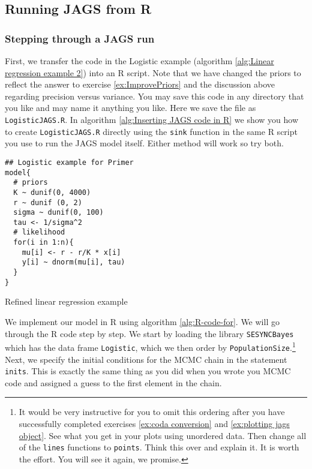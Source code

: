 \documentclass[12pt,english]{article}
\begin{document}
\subsection{Running JAGS from R}

\subsubsection{Stepping through a JAGS run} \label{sssec:Stepping through a JAGS run}

First, we transfer the code in the Logistic example (algorithm \ref{alg:Linear regression example 2}) into an R script. Note that we have changed the priors to reflect the answer to exercise \ref{ex:ImprovePriors} and the discussion above regarding precision versus variance. You may save this code in any directory that you like and may name it anything you like. Here we save the file as \texttt{LogisticJAGS.R}. In algorithm \ref{alg:Inserting JAGS code in R} we show you how to create \texttt{LogisticJAGS.R} directly using the \texttt{sink} function in the same R script you use to run the JAGS model itself. Either method will work so try both.

\begin{algorithm}
\begin{Verbatim}[frame=single]
## Logistic example for Primer
model{
  # priors
  K ~ dunif(0, 4000)
  r ~ dunif (0, 2)
  sigma ~ dunif(0, 100) 
  tau <- 1/sigma^2
  # likelihood
  for(i in 1:n){
    mu[i] <- r - r/K * x[i]
    y[i] ~ dnorm(mu[i], tau)
  }
}
\end{Verbatim}
\caption{Refined linear regression example}
\label{alg:Linear regression example 2}
\end{algorithm}

We implement our model in R using algorithm \ref{alg:R-code-for}. We will go through the R code step by step. We start by loading the library \texttt{SESYNCBayes} which has the data frame \texttt{Logistic}, which we then order by \texttt{PopulationSize}.\footnote{It would be very instructive for you to omit this ordering after you have successfully completed exercises \ref{ex:coda conversion} and \ref{ex:plotting jags object}. See what you get in your plots using unordered data. Then change all of the \texttt{lines} functions to \texttt{points}. Think this over and explain it. It is worth the effort. You will see it again, we promise.} Next, we specify the initial conditions for the MCMC chain in the statement \texttt{inits}. This is exactly the same thing as you did when you wrote you MCMC code and assigned a guess to the first element in the chain. 
\end{document}
